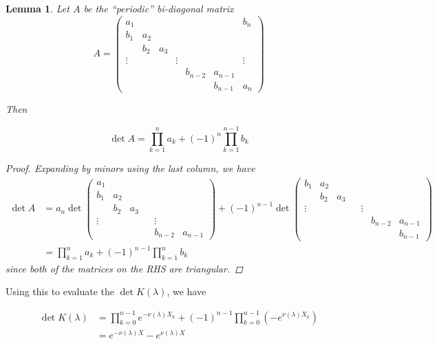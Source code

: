 \documentclass[12pt]{article}
\newtheorem{lemma}{Lemma}
\begin{document}
\begin{lemma}
Let $A$ be the ``periodic'' bi-diagonal matrix
\begin{equation}
A = \begin{pmatrix}
a_1 & & & & & & b_n \\
b_1 & a_2 \\
& b_2 & a_3 \\
\vdots & & & \vdots & &&  \vdots \\
& & & & b_{n-2} & a_{n-1} \\
& & & & & b_{n-1} & a_n
\end{pmatrix}
\end{equation}

Then 

\begin{equation}
\det{A} = \prod_{k = 1}^n a_k + (-1)^n \prod_{k = 1}^{n-1} b_k
\end{equation}

\begin{proof}
Expanding by minors using the last column, we have
\begin{align*}
\det A &= a_n \det
\begin{pmatrix}
a_1 \\
b_1 & a_2 \\
& b_2 & a_3 \\
\vdots & & & & \vdots \\
& & & & b_{n-2} & a_{n-1}
\end{pmatrix}
+ (-1)^{n-1} \det
\begin{pmatrix}
b_1 & a_2 \\
& b_2 & a_3 \\
\vdots & & & & \vdots \\
& & & & & b_{n-2} & a_{n-1} \\
& & & & & & b_{n-1}
\end{pmatrix} \\
&= \prod_{k = 1}^n a_k + (-1)^{n-1} \prod_{k = 1}^n b_k
\end{align*}
since both of the matrices on the RHS are triangular.
\end{proof}
\end{lemma}

Using this to evaluate the $\det K(\lambda)$, we have

\begin{align*}
\det K(\lambda) &= \prod_{k = 0}^{n-1} e^{-\nu(\lambda)X_k} + (-1)^{n-1} \prod_{k = 0}^{n-1} (-e^{\nu(\lambda)X_k}) \\
&= e^{-\nu(\lambda) X} - e^{\nu(\lambda) X}
\end{align*}
\end{document}
